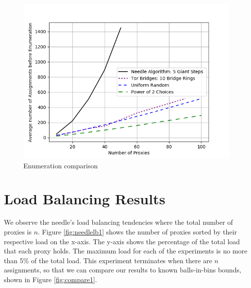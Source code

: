 \begin{figure}[h!]
\centering
     \includegraphics[width=1.0\textwidth]{fig/comparison_graph.png}
    \caption{Enumeration comparison}

    \label{fig:comparison}
\end{figure}

\section{Load Balancing Results}

We observe the needle's load balancing tendencies where the total number of proxies is $n$. Figure \ref{fig:needlelb1} shows the number of proxies sorted by their respective load on the x-axis. The y-axis shows the percentage of the total load that each proxy holds. The maximum load for each of the experiments is no more than 5\% of the total load. This experiment terminates when there are $n$ assignments, so that we can compare our results to known balls-in-bins bounds, shown in Figure \ref{fig:compare1}.

